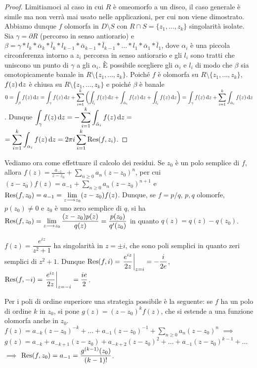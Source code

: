 \begin{proof}
  Limitiamoci al caso in cui $R$ è omeomorfo a un disco, il caso generale è simile ma non verrà mai usato nelle applicazioni, per cui non viene dimostrato. Abbiamo dunque $f$ olomorfa in $D\setminus S$ con $R \cap S=\{z_1, \dots, z_k\}$ singolarità isolate.
  Sia $\gamma=\partial R$ (percorso in senso antiorario) e $\beta=\gamma*l_k*\bar{\alpha}_k*\bar{l}_k*l_{k-1}*\bar{\alpha}_{k-1}*\bar{l}_{k-1}*\dots*l_1*\bar{\alpha}_1*\bar{l}_1$, dove $\alpha_i$ è una piccola circonferenza intorno a $z_i$ percorsa in senso antiorario e gli $l_i$ sono tratti che uniscono un punto di $\gamma$ a gli $\alpha_i$.
  È possibile scegliere gli $\alpha_i$ e $l_i$ di modo che $\beta$ sia omotopicamente banale in $R\setminus \{z_1,\dots, z_k\}$.
  Poiché $f$ è olomorfa su $R \setminus \{z_1, \dots, z_k\}$, $f(z)\mathop{}\!\mathrm{d} z$ è chiusa su $R \setminus \{z_1, \dots, z_k\}$ e poiché $\beta$ è banale $\displaystyle 0=\int_{\beta}f(z)\mathop{}\!\mathrm{d} z=\int_{\gamma} f(z)\mathop{}\!\mathrm{d} z+\sum_{i=1}^k \left(\int_{\bar{l}_i} f(z)\mathop{}\!\mathrm{d} z+\int_{\bar{\alpha}_i}f(z)\mathop{}\!\mathrm{d} z+\int_{l_i}f(z)\mathop{}\!\mathrm{d} z\right)=\int_{\gamma} f(z)\mathop{}\!\mathrm{d} z+\sum_{i=1}^k \int_{\bar{\alpha}_i}f(z)\mathop{}\!\mathrm{d} z$.
  Dunque $\displaystyle \int_{\gamma} f(z)\mathop{}\!\mathrm{d} z=-\sum_{i=1}^k \int_{\bar{\alpha}_i}f(z)\mathop{}\!\mathrm{d} z=$\\
  $\displaystyle =\sum_{i=1}^k \int_{\alpha_i}f(z)\mathop{}\!\mathrm{d} z=2\pi i \sum_{i=1}^k \text{Res}(f, z_i)$.
\end{proof}

Vediamo ora come effettuare il calcolo dei residui. Se $z_0$ è un polo semplice di $f$, allora $\displaystyle f(z)=\frac{a_{-1}}{z-z_0}+\sum_{n \ge 0} a_n(z-z_0)^n$, per cui $\displaystyle (z-z_0)f(z)=a_{-1}+\sum_{n \ge 0} a_n(z-z_0)^{n+1}$ e $\text{Res}(f,z_0)=a_{-1}=\displaystyle \lim_{z \longrightarrow z_0} (z-z_0)f(z)$.
Dunque, se $f=p/q$, $p, q$ olomorfe, $p(z_0)\not=0$ e $z_0$ è uno zero semplice di $q$, si ha $\displaystyle \text{Res}(f,z_0)=\lim_{z\longrightarrow z_0} \frac{(z-z_0)p(z)}{q(z)}=\frac{p(z_0)}{q'(z_0)}$ in quanto $q(z)=q(z)-q(z_0)$.

\begin{ex}
  $f(z)=\dfrac{e^{iz}}{z^2+1}$ ha singolarità in $z=\pm i$, che sono poli semplici in quanto zeri semplici di $z^2+1$. Dunque $\text{Res}(f,i)=\left.\dfrac{e^{iz}}{2z}\right|_{z=i}=-\dfrac{i}{2e}$, $\text{Res}(f,-i)=\left.\dfrac{e^{iz}}{2z}\right|_{z=-i}=\dfrac{ie}{2}$.
\end{ex}

Per i poli di ordine superiore una strategia possibile è la seguente: se $f$ ha un polo di ordine $k$ in $z_0$, si pone $g(z)=(z-z_0)^kf(z)$, che si estende a una funzione olomorfa anche in $z_0$.
$f(z)=a_{-k}(z-z_0)^{-k}+\dots+a_{-1}(z-z_0)^{-1}+\sum_{n \ge 0} a_n(z-z_0)^n$ $\implies$ $g(z)=a_{-k}+a_{-k+1}(z-z_0)+a_{-k+2}(z-z_0)^2+\dots+a_{-1}(z-z_0)^{k-1}+\dots$ $\implies$ $\text{Res}(f,z_0)=a_{-1}=\dfrac{g^{(k-1)}(z_0)}{(k-1)!}$.

